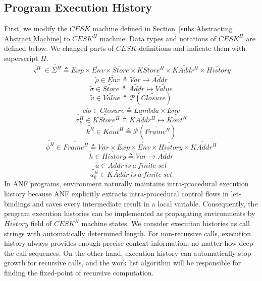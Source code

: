 \documentclass{article}
\begin{document}
\subsection{Program Execution History}
\label{sub:Program Execution History}
First, we modify the $CESK$ machine defined in Section~\ref{subs:Abstracting Abstract Machine} to $CESK^H$ machine.
Data types and notations of $CESK^H$ are defined below. We changed parts of $CESK$ definitions and indicate them with superscript $H$.
\[
\tag{states}
\widetilde{\varsigma^H}\in\widetilde{\Sigma^H} \triangleq Exp \times \widetilde{Env} \times \widetilde{Store}
\times \widetilde{KStore^H} \times \widetilde{KAddr^H} \times \widetilde{History}
\]
\[
\tag{environments}
\tilde{\rho} \in \widetilde{Env} \triangleq Var \to \widetilde{Addr}
\]
\[
\tag{stores}
\tilde{\sigma} \in \widetilde{Store} \triangleq \widetilde{Addr} \mapsto \widetilde{Value}
\]
\[
\tag{abstract values}
\tilde{v} \in \widetilde{Value} \triangleq \mathcal{P}(\widetilde{Closure})
\]
\[
\tag{closures}
\widetilde{clo} \in \widetilde{Closure} \triangleq Lambda \times \widetilde{Env}
\]
\[
\tag{continuation stores}
\widetilde{\sigma_k^H} \in \widetilde{KStore^H} \triangleq  \widetilde{KAddr^H} \mapsto  \widetilde{Kont^H}
\]
\[
\tag{abstract continuations}
\widetilde{k^H} \in  \widetilde{Kont^H} \triangleq  \mathcal{P}(\widetilde{Frame^H})
\]
\[
\tag{stack frames}
\widetilde{\phi^H} \in  \widetilde{Frame^H} \triangleq Var \times Exp \times  \widetilde{Env} \times \widetilde{History} \times  \widetilde{KAddr^H}
\]
\[
\tag{histories}
\tilde{h} \in \widetilde{History} \triangleq Var \to \widetilde{Addr}
\]
\[
\tag{value addresses}
\tilde{a} \in \widetilde{Addr} \ is\ a\ finite\ set
\]
\[
\tag{continuation addresses}
\widetilde{a_k^H} \in \widetilde{KAddr} \ is\ a\ finite\ set
\]
In ANF programs, environment naturally maintains intra-procedural execution history because ANF explicitly extracts intra-procedural control flows in let-bindings and saves every intermediate result in a local variable.
Consequently, the program execution histories can be implemented as propagating environments by $\widetilde{History}$ field of $CESK^H$ machine states.
We consider execution histories as call strings with automatically determined length. For non-recursive calls, execution history always provides enough precise context information, no matter how deep the call sequences. On the other hand, execution history can automatically stop growth for recursive calls, and the work list algorithm will be responsible for finding the fixed-point of recursive computation.
\end{document}
